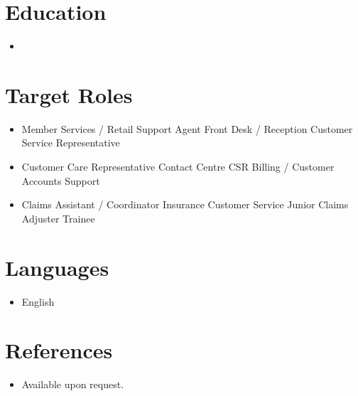 \documentclass[11pt,a4paper,sans]{moderncv}
\begin{document}
\section{Education}
\vspace{1pt}
\begin{itemize}
\item{}
\end{itemize}

\section{Target Roles}
\vspace{1pt}
\begin{itemize}
\item Member Services / Retail Support Agent \textbullet{} Front Desk / Reception \textbullet{} Customer Service Representative
\item Customer Care Representative \textbullet{} Contact Centre CSR \textbullet{} Billing / Customer Accounts Support
\item Claims Assistant / Coordinator \textbullet{} Insurance Customer Service \textbullet{} Junior Claims Adjuster Trainee
\end{itemize}

\section{Languages}
\vspace{1pt}
\begin{itemize}
\item English
\end{itemize}

\section{References}
\vspace{1pt}
\begin{itemize}
\item{Available upon request.}
\end{itemize}
\end{document}
